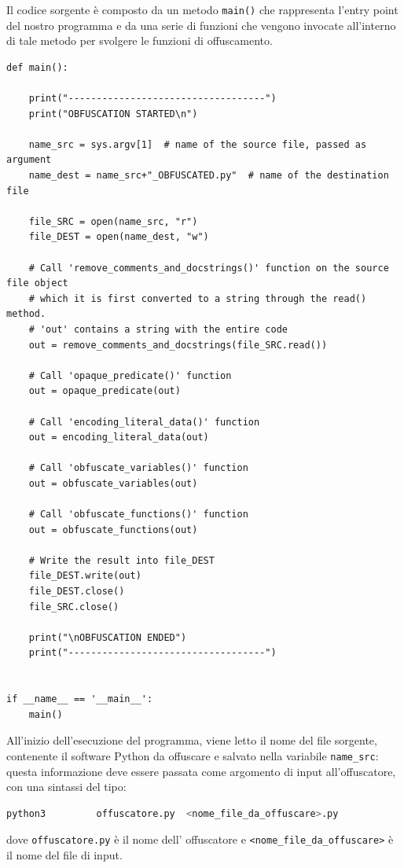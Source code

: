 \documentclass[a4paper,oneside,openright,titlepage,10pt,footinclude,headinclude]{scrbook}
\begin{document}
Il codice sorgente è composto da  un metodo \texttt{main()} che rappresenta l'entry point del nostro programma e da una serie di funzioni  che vengono invocate all'interno di tale metodo per svolgere le funzioni di offuscamento.
\begin{graybox}[innerleftmargin=2,]
\begin{lstlisting}
def main():

    print("-----------------------------------")
    print("OBFUSCATION STARTED\n")

    name_src = sys.argv[1]  # name of the source file, passed as argument
    name_dest = name_src+"_OBFUSCATED.py"  # name of the destination file

    file_SRC = open(name_src, "r")
    file_DEST = open(name_dest, "w")

    # Call 'remove_comments_and_docstrings()' function on the source file object
    # which it is first converted to a string through the read() method.
    # 'out' contains a string with the entire code
    out = remove_comments_and_docstrings(file_SRC.read())   

    # Call 'opaque_predicate()' function
    out = opaque_predicate(out)

    # Call 'encoding_literal_data()' function
    out = encoding_literal_data(out)

    # Call 'obfuscate_variables()' function
    out = obfuscate_variables(out)
    
    # Call 'obfuscate_functions()' function
    out = obfuscate_functions(out)

    # Write the result into file_DEST
    file_DEST.write(out)
    file_DEST.close()
    file_SRC.close()

    print("\nOBFUSCATION ENDED")
    print("-----------------------------------")


if __name__ == '__main__':
    main()
\end{lstlisting}
\end{graybox}

All'inizio dell'esecuzione del programma, viene letto il nome del file sorgente, contenente il software Python da offuscare e salvato nella variabile \texttt{name\_src}: questa informazione deve essere passata come argomento di input all'offuscatore, con una sintassi del tipo:
\begin{graybox}
\begin{lstlisting}[language=bash,basicstyle=\fontsize{10}{9}\selectfont,]
python3  		offuscatore.py 	<nome_file_da_offuscare>.py
\end{lstlisting}
\end{graybox}
\noindent dove \texttt{offuscatore.py} è il nome dell' offuscatore e \texttt{<nome\_file\_da\_offuscare>} è il nome del file di input.
\end{document}
